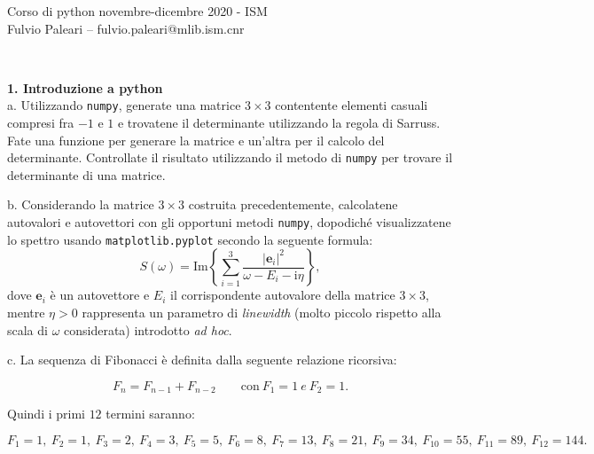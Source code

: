 \documentclass[addpoints]{exam}
\newenvironment{palatino}{\fontfamily{ppl}\selectfont}{\par}
\begin{document}
\begin{palatino}

\noindent Corso di python novembre-dicembre 2020 - ISM \\
\noindent Fulvio Paleari -- fulvio.paleari@mlib.ism.cnr

\hrulefill
\vspace{0.2in}\\
\setlength{\parindent}{0pt}

\textbf{1. Introduzione a python} \\

a. \quad Utilizzando \texttt{numpy}, generate una matrice $3\times 3$ contentente elementi casuali compresi fra $-1$ e $1$ e trovatene il determinante utilizzando la regola di Sarruss. Fate una funzione per generare la matrice e un'altra per il calcolo del determinante. Controllate il risultato utilizzando il metodo di \texttt{numpy} per trovare il determinante di una matrice.

\hphantom{ciao}

b. Considerando la matrice $3\times 3$ costruita precedentemente, calcolatene autovalori e autovettori con gli opportuni metodi \texttt{numpy}, dopodiché visualizzatene lo spettro usando \texttt{matplotlib.pyplot} secondo la seguente formula:
\begin{equation*}
	S(\omega)= \mathrm{Im}\left\{\sum_{i=1}^3 \frac{|\mathbf{e}_i|^2}{\omega-E_i-\mathrm{i}\eta} \right\},
\end{equation*} 
dove $\mathbf{e}_i$ è un autovettore e $E_i$ il corrispondente autovalore della matrice $3\times 3$, mentre $\eta>0$ rappresenta un parametro di \textit{linewidth} (molto piccolo rispetto alla scala di $\omega$ considerata) introdotto \textit{ad hoc}.

\hphantom{ciao}

c. \quad La sequenza di Fibonacci è definita dalla seguente relazione ricorsiva:

\begin{equation*}
	F_n = F_{n-1}+F_{n-2} \qquad \mathrm{con} \ F_1 = 1 \ e \ F_2 = 1.
\end{equation*}

Quindi i primi $12$ termini saranno:

\begin{equation*}
	F_1 = 1, \
	F_2 = 1, \
	F_3 = 2, \
	F_4 = 3, \
	F_5 = 5, \
	F_6 = 8, \
	F_7 = 13, \
	F_8 = 21, \
	F_9 = 34, \
	F_{10} = 55, \
	F_{11} = 89, \
	F_{12} = 144.
\end{equation*}


\end{palatino}
\end{document}

